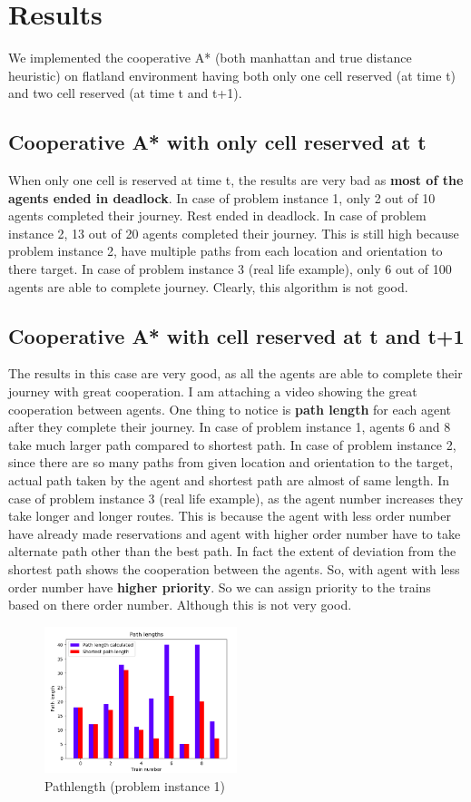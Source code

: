 \section{Results}
We implemented the cooperative A* (both manhattan and true distance heuristic) on flatland environment 
having both only one cell reserved (at time t) and two cell reserved (at time t and t+1).

\subsection{Cooperative A* with only cell reserved at t}
When only one cell is reserved at time t, the results are very bad as \textbf{most of the agents ended in 
deadlock}. In case of problem instance 1, only 2 out of 10 agents completed their journey. Rest ended in deadlock.
In case of problem instance 2, 13 out of 20 agents completed their journey. This is still high because problem 
instance 2, have multiple paths from each location and orientation to there target.
In case of problem instance 3 (real life example), only 6 out of 100 agents are able to complete journey.
Clearly, this algorithm is not good. 

\subsection{Cooperative A* with cell reserved at t and t+1}
The results in this case are very good, as all the agents are able to complete their journey with great cooperation.
I am attaching a video showing the great cooperation between agents. One thing to notice is \textbf{path length}
for each agent after they complete their journey. In case of problem instance 1, agents 6 and 8 take much larger path
compared to shortest path. In case of problem instance 2, since there are so many paths from given location 
and orientation to the target, actual path taken by the agent and shortest path are almost of same length.
In case of problem instance 3 (real life example), as the agent number increases they take longer and longer routes.
This is because the agent with less order number have already made reservations and agent with higher order number 
have to take alternate path other than the best path. In fact the extent of deviation from the 
shortest path shows the cooperation between the agents. So, with agent with less order number have 
\textbf{higher priority}. So we can assign priority to the trains based on there order number.
Although this is not very good.
\begin{figure}[h]
    \centering
    \includegraphics[width=0.5\textwidth]{cooperative3}
    \caption{Pathlength (problem instance 1)}
    \label{image-myimage2}
\end{figure}

